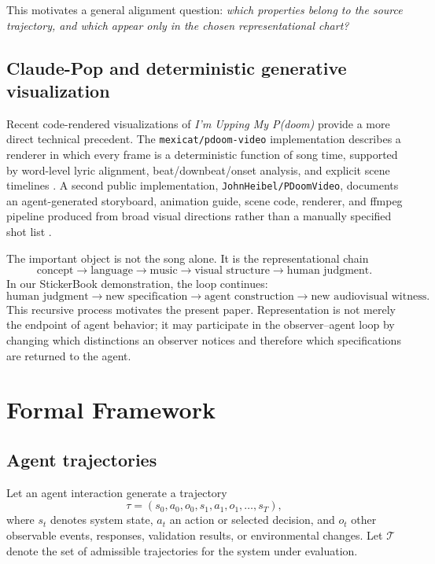 \documentclass[11pt]{article}
\newcommand{\T}{\mathcal{T}}
\begin{document}
This motivates a general alignment question: \emph{which properties belong to the source trajectory, and which appear only in the chosen representational chart?}

\subsection{Claude-Pop and deterministic generative visualization}
Recent code-rendered visualizations of \emph{I'm Upping My P(doom)} provide a more direct technical precedent. The \texttt{mexicat/pdoom-video} implementation describes a renderer in which every frame is a deterministic function of song time, supported by word-level lyric alignment, beat/downbeat/onset analysis, and explicit scene timelines \citep{mexicat2026pdoom}. A second public implementation, \texttt{JohnHeibel/PDoomVideo}, documents an agent-generated storyboard, animation guide, scene code, renderer, and ffmpeg pipeline produced from broad visual directions rather than a manually specified shot list \citep{heibel2026pdoom}.

The important object is not the song alone. It is the representational chain
\begin{equation}
\text{concept}
\rightarrow
\text{language}
\rightarrow
\text{music}
\rightarrow
\text{visual structure}
\rightarrow
\text{human judgment}.
\end{equation}
In our StickerBook demonstration, the loop continues:
\begin{equation}
\text{human judgment}
\rightarrow
\text{new specification}
\rightarrow
\text{agent construction}
\rightarrow
\text{new audiovisual witness}.
\end{equation}
This recursive process motivates the present paper. Representation is not merely the endpoint of agent behavior; it may participate in the observer--agent loop by changing which distinctions an observer notices and therefore which specifications are returned to the agent.

\section{Formal Framework}

\subsection{Agent trajectories}
Let an agent interaction generate a trajectory
\begin{equation}
\tau=(s_0,a_0,o_0,s_1,a_1,o_1,\ldots,s_T),
\end{equation}
where $s_t$ denotes system state, $a_t$ an action or selected decision, and $o_t$ other observable events, responses, validation results, or environmental changes. Let $\T$ denote the set of admissible trajectories for the system under evaluation.
\end{document}

